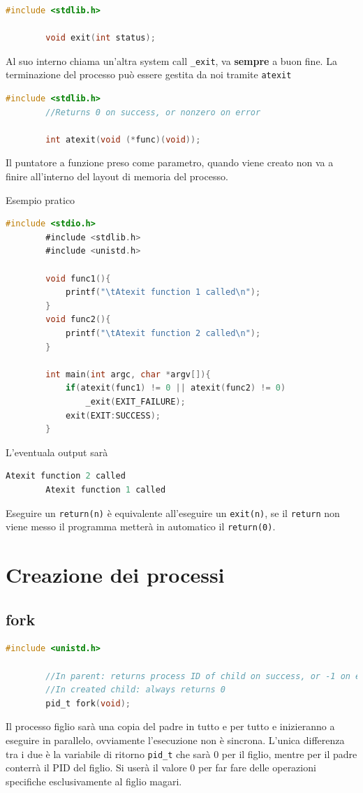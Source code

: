 \documentclass[a4paper, 12pt]{book}
\begin{document}
    \begin{lstlisting}[language=C]
        #include <stdlib.h>

        void exit(int status);
    \end{lstlisting} 
    Al suo interno chiama un'altra system call \verb|_exit|,
    va \textbf{sempre} a buon fine. La terminazione 
    del processo può essere gestita da noi tramite
    \verb|atexit|
    
    \begin{lstlisting}[language=C]
        #include <stdlib.h> 
        //Returns 0 on success, or nonzero on error

        int atexit(void (*func)(void));
    \end{lstlisting} 
    Il puntatore a funzione preso come parametro, quando 
    viene creato non va a finire all'interno del layout 
    di memoria del processo.

    Esempio pratico
    \begin{lstlisting}[language=C]
        #include <stdio.h>
        #include <stdlib.h>
        #include <unistd.h>

        void func1(){
            printf("\tAtexit function 1 called\n");
        }
        void func2(){
            printf("\tAtexit function 2 called\n");
        }

        int main(int argc, char *argv[]){
            if(atexit(func1) != 0 || atexit(func2) != 0)
                _exit(EXIT_FAILURE);
            exit(EXIT:SUCCESS);
        }
    \end{lstlisting}
    L'eventuala output sarà
    \begin{lstlisting}[language=C]
        Atexit function 2 called
        Atexit function 1 called
    \end{lstlisting}
    Eseguire un \verb|return(n)| è equivalente all'eseguire 
    un \verb|exit(n)|, se il \verb|return| non viene messo il 
    programma metterà in automatico il \verb|return(0)|.

    \section{Creazione dei processi}

    \subsection{fork}

    \begin{lstlisting}[language=C]
        #include <unistd.h>

        //In parent: returns process ID of child on success, or -1 on error
        //In created child: always returns 0
        pid_t fork(void);
    \end{lstlisting}
    Il processo figlio sarà una copia del padre in tutto e per tutto e inizieranno 
    a eseguire in parallelo, ovviamente l'esecuzione non è sincrona. L'unica differenza tra 
    i due è la variabile di ritorno \verb|pid_t| che sarà 0 per il figlio, mentre per il 
    padre conterrà il PID del figlio. Si userà il valore 0 per far fare delle operazioni 
    specifiche esclusivamente al figlio magari. 
\end{document}
